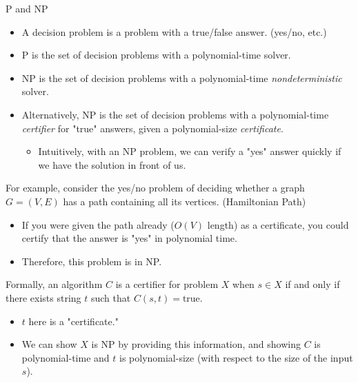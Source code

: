 \documentclass{beamer}
\begin{document}
\begin{frame}[t]{P and NP}
    \begin{itemize}
        \item A \alert{decision problem} is a problem with a true/false answer. (yes/no, etc.)
        \item \alert{P} is the set of decision problems with a polynomial-time solver.
        \item \alert{NP} is the set of decision problems with a polynomial-time \emph{nondeterministic} solver.
        \item Alternatively, NP is the set of decision problems with a polynomial-time \emph{certifier} for "true" answers, given a polynomial-size \emph{certificate}.
        \begin{itemize}
            \item Intuitively, with an NP problem, we can verify a "yes" answer quickly if we have the solution in front of us.
        \end{itemize}
    \end{itemize}

    \vspace{0.5em}
    \pause

    For example, consider the yes/no problem of deciding whether a graph $G = (V, E)$ has a path containing all its vertices. (Hamiltonian Path)
    \begin{itemize}
        \item If you were given the path already ($O(V)$ length) as a certificate, you could certify that the answer is "yes" in polynomial time.
        \item Therefore, this problem is in NP.
    \end{itemize}

    \vspace{0.5em}
    \pause

    Formally, an algorithm $C$ is a certifier for problem $X$ when $s \in X$ if and only if there exists string $t$ such that $C(s,t)=\text{true}$.
    \begin{itemize}
        \item $t$ here is a "certificate."
        \item We can show $X$ is NP by providing this information, and showing $C$ is polynomial-time and $t$ is polynomial-size (with respect to the size of the input $s$).
    \end{itemize}


\end{frame}
\end{document}
